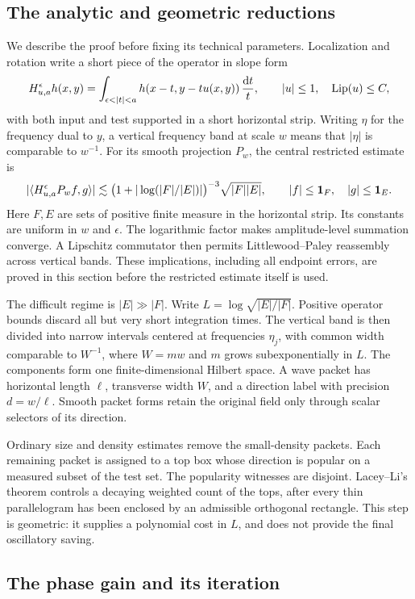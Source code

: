 \subsection{The analytic and geometric reductions}

We describe the proof before fixing its technical parameters.
Localization and rotation write a short piece of the operator in
slope form
\[
 H_{u,a}^{\epsilon}h(x,y)
 =\int_{\epsilon<|t|<a}
 h(x-t,y-tu(x,y))\,\frac{\mathrm dt}{t},
 \qquad |u|\le1,\quad \Lip(u)\le C,
\]
with both input and test supported in a short horizontal strip.
Writing \(\eta\) for the frequency dual to \(y\), a vertical
frequency band at scale \(w\) means that \(|\eta|\) is comparable
to \(w^{-1}\). For its smooth projection \(P_w\), the
central restricted estimate is
\[
 |\langle H_{u,a}^{\epsilon}P_w f,g\rangle|
 \lesssim
 \bigl(1+|\log(|F|/|E|)|\bigr)^{-3}\sqrt{|F||E|},
 \qquad |f|\le\mathbf 1_F,\quad |g|\le\mathbf 1_E.
\]
Here \(F,E\) are sets of positive finite measure in the horizontal
strip. Its constants are uniform in \(w\) and \(\epsilon\). The logarithmic
factor makes amplitude-level summation converge. A Lipschitz
commutator then permits Littlewood--Paley reassembly across vertical
bands. These implications, including all endpoint errors, are proved
in this section before the restricted estimate itself is used.

The difficult regime is \(|E|\gg|F|\). Write
\(L=\log\sqrt{|E|/|F|}\). Positive operator bounds discard all but
very short integration times. The vertical band is then divided into
narrow intervals centered at frequencies \(\eta_j\), with common
width comparable to \(W^{-1}\), where \(W=mw\) and \(m\) grows
subexponentially in \(L\). The components form one finite-dimensional
Hilbert space. A wave packet has horizontal length \(\ell\),
transverse width \(W\), and a direction label with precision
\(d=w/\ell\). Smooth packet forms retain the original field only
through scalar selectors of its direction.

Ordinary size and density estimates remove the small-density packets.
Each remaining packet is assigned to a top box whose direction is
popular on a measured subset of the test set. The popularity witnesses
are disjoint. Lacey--Li's theorem controls a decaying weighted count
of the tops, after every thin parallelogram has been enclosed by an
admissible orthogonal rectangle. This step is geometric: it supplies
a polynomial cost in \(L\), and does not provide the final
oscillatory saving.

\subsection{The phase gain and its iteration}

